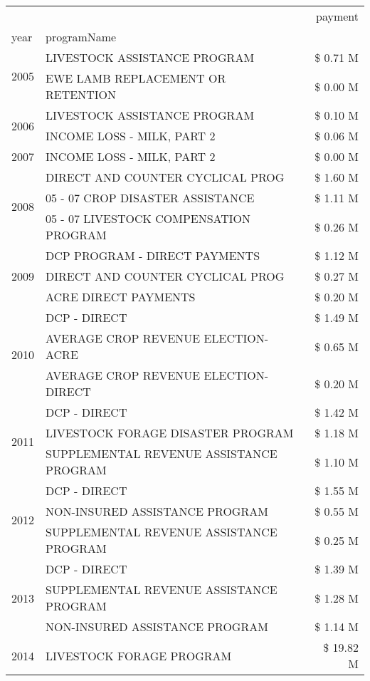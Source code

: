 \begin{tabular}{llr}
\toprule
 &  & payment \\
year & programName &  \\
\midrule
\multirow[t]{2}{*}{2005} & LIVESTOCK ASSISTANCE PROGRAM & \$ 0.71 M \\
 & EWE LAMB REPLACEMENT OR RETENTION & \$ 0.00 M \\
\cline{1-3}
\multirow[t]{2}{*}{2006} & LIVESTOCK ASSISTANCE PROGRAM & \$ 0.10 M \\
 & INCOME LOSS - MILK, PART 2 & \$ 0.06 M \\
\cline{1-3}
2007 & INCOME LOSS - MILK, PART 2 & \$ 0.00 M \\
\cline{1-3}
\multirow[t]{3}{*}{2008} & DIRECT AND COUNTER CYCLICAL PROG & \$ 1.60 M \\
 & 05 - 07 CROP DISASTER ASSISTANCE & \$ 1.11 M \\
 & 05 - 07 LIVESTOCK COMPENSATION PROGRAM & \$ 0.26 M \\
\cline{1-3}
\multirow[t]{3}{*}{2009} & DCP PROGRAM - DIRECT PAYMENTS & \$ 1.12 M \\
 & DIRECT AND COUNTER CYCLICAL PROG & \$ 0.27 M \\
 & ACRE DIRECT PAYMENTS & \$ 0.20 M \\
\cline{1-3}
\multirow[t]{3}{*}{2010} & DCP - DIRECT & \$ 1.49 M \\
 & AVERAGE CROP REVENUE ELECTION-ACRE & \$ 0.65 M \\
 & AVERAGE CROP REVENUE ELECTION-DIRECT & \$ 0.20 M \\
\cline{1-3}
\multirow[t]{3}{*}{2011} & DCP - DIRECT & \$ 1.42 M \\
 & LIVESTOCK FORAGE DISASTER PROGRAM & \$ 1.18 M \\
 & SUPPLEMENTAL REVENUE ASSISTANCE PROGRAM & \$ 1.10 M \\
\cline{1-3}
\multirow[t]{3}{*}{2012} & DCP - DIRECT & \$ 1.55 M \\
 & NON-INSURED ASSISTANCE PROGRAM & \$ 0.55 M \\
 & SUPPLEMENTAL REVENUE ASSISTANCE PROGRAM & \$ 0.25 M \\
\cline{1-3}
\multirow[t]{3}{*}{2013} & DCP - DIRECT & \$ 1.39 M \\
 & SUPPLEMENTAL REVENUE ASSISTANCE PROGRAM & \$ 1.28 M \\
 & NON-INSURED ASSISTANCE PROGRAM & \$ 1.14 M \\
\cline{1-3}
\multirow[t]{3}{*}{2014} & LIVESTOCK FORAGE PROGRAM & \$ 19.82 M \\

\end{tabular}
